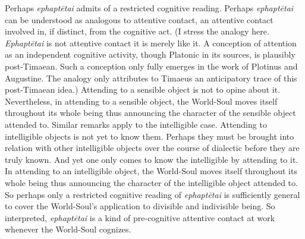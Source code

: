 Perhaps \emph{ephaptētai} admits of a restricted cognitive reading. Perhaps \emph{ephaptētai} can be understood as analogous to attentive contact, an attentive contact involved in, if distinct, from the cognitive act. (I stress the analogy here. \emph{Ephaptētai} is not attentive contact it is merely like it. A conception of attention as an independent cognitive activity, though Platonic in its sources, is plausibly post-Timaean. Such a conception only fully emerges in the work of Plotinus and Augustine. The analogy only attributes to Timaeus an anticipatory trace of this post-Timaean idea.) Attending to a sensible object is not to opine about it. Nevertheless, in attending to a sensible object, the World-Soul moves itself throughout its whole being thus announcing the character of the sensible object attended to. Similar remarks apply to the intelligible case. Attending to intelligible objects is not yet to know them. Perhaps they must be brought into relation with other intelligible objects over the course of dialectic before they are truly known. And yet one only comes to know the intelligible by attending to it. In attending to an intelligible object, the World-Soul moves itself throughout its whole being thus announcing the character of the intelligible object attended to. So perhaps only a restricted cognitive reading of \emph{ephaptētai} is sufficiently general to cover the World-Soul's application to divisible and indivisible being. So interpreted, \emph{ephaptētai} is a kind of pre-cognitive attentive contact at work whenever the World-Soul cognizes.

